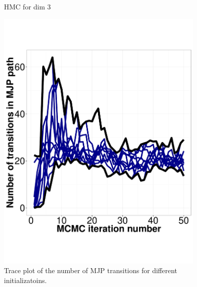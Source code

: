 \begin{figure}
\begin{minipage}[hp]{0.45\linewidth}
      \end{minipage}
    \caption{HMC for dim 3}
    \label{fig:HMC_DIM_3}
  \end{figure}
  
  \begin{figure}%
  \centering
  \begin{minipage}[hp]{0.45\linewidth}
  \centering
    \includegraphics [width=0.90\textwidth, angle=0]{figs/exp3_k2_path_transition.pdf}
      \end{minipage}
    \caption{Trace plot of the number of MJP transitions for different initializatoins.}
	\label{fig:Transition_exp}
  \end{figure}

